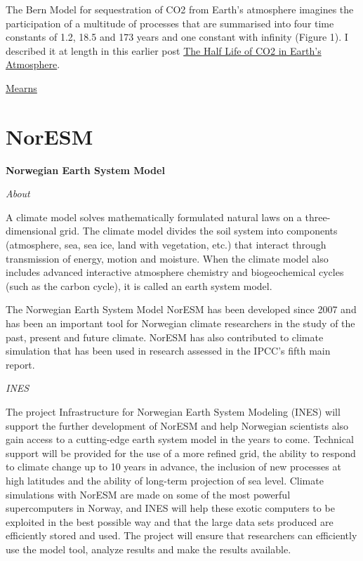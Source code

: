 \documentclass[
]{book}
\begin{document}
The Bern Model for sequestration of CO2 from Earth's atmosphere imagines the participation of a multitude of processes that are summarised into four time constants of 1.2, 18.5 and 173 years and one constant with infinity (Figure 1). I described it at length in this earlier post \href{http://euanmearns.com/?p=4490}{The Half Life of CO2 in Earth's Atmosphere}.

\href{https://euanmearns.com/whats-up-with-the-bern-model/}{Mearns}

\hypertarget{noresm}{%
\section{NorESM}\label{noresm}}

\textbf{Norwegian Earth System Model}

\emph{About}

A climate model solves mathematically formulated natural laws on a three-dimensional grid. The climate model divides the soil system into components (atmosphere, sea, sea ice, land with vegetation, etc.) that interact through transmission of energy, motion and moisture. When the climate model also includes advanced interactive atmosphere chemistry and biogeochemical cycles (such as the carbon cycle), it is called an earth system model.

The Norwegian Earth System Model NorESM has been developed since 2007 and has been an important tool for Norwegian climate researchers in the study of the past, present and future climate. NorESM has also contributed to climate simulation that has been used in research assessed in the IPCC's fifth main report.

\emph{INES}

The project Infrastructure for Norwegian Earth System Modeling (INES) will support the further development of NorESM and help Norwegian scientists also gain access to a cutting-edge earth system model in the years to come. Technical support will be provided for the use of a more refined grid, the ability to respond to climate change up to 10 years in advance, the inclusion of new processes at high latitudes and the ability of long-term projection of sea level.
Climate simulations with NorESM are made on some of the most powerful supercomputers in Norway, and INES will help these exotic computers to be exploited in the best possible way and that the large data sets produced are efficiently stored and used. The project will ensure that researchers can efficiently use the model tool, analyze results and make the results available.
\end{document}
